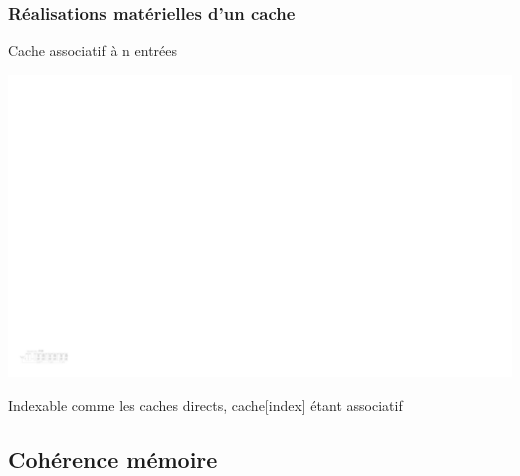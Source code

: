 \documentclass{beamer}
\begin{document}
\begin{frame}
\frametitle{Réalisations matérielles d'un cache}
\begin{block}{Cache associatif à n entrées}

\centering\includegraphics[width=\linewidth]{Figs/nway_cache.pdf}

Indexable comme les caches directs, cache[index] étant associatif
\end{block}
\end{frame}

\subsection{Cohérence mémoire}
\end{document}
